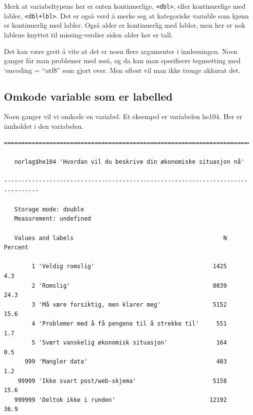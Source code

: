\documentclass[
  letterpaper,
  DIV=11,
  numbers=noendperiod]{scrreprt}
\newenvironment{Shaded}{\begin{snugshade}}{\end{snugshade}}
\newcommand{\FunctionTok}[1]{\textcolor[rgb]{0.28,0.35,0.67}{#1}}
\newcommand{\NormalTok}[1]{\textcolor[rgb]{0.00,0.23,0.31}{#1}}
\newcommand{\SpecialCharTok}[1]{\textcolor[rgb]{0.37,0.37,0.37}{#1}}
\begin{document}
Merk at variabeltypene her er enten kontinuerlige,
\texttt{\textless{}dbl\textgreater{}}, eller kontinuerlige med labler,
\texttt{\textless{}dbl+lbl\textgreater{}}. Det er også verd å merke seg
at kategoriske variable som kjønn er kontinuerlig med labler. Også alder
er kontinuerlig med labler, men her er nok lablene knyttet til
missing-verdier siden alder her er tall.

Det kan være greit å vite at det er noen flere argumenter i
innlesningen. Noen ganger får man problemer med æøå, og da kan man
spesifisere tegnsetting med `encoding = ``utf8'' som gjort over. Men
oftest vil man ikke trenge akkurat det.

\hypertarget{omkode-variable-som-er-labelled}{%
\subsection{Omkode variable som er
labelled}\label{omkode-variable-som-er-labelled}}

Noen ganger vil vi omkode en variabel. Et eksempel er variabelen he104.
Her er innholdet i den variabelen.

\begin{Shaded}
\end{Shaded}

\begin{verbatim}
================================================================================

   norlag$he104 'Hvordan vil du beskrive din økonomiske situasjon nå'

--------------------------------------------------------------------------------

   Storage mode: double
   Measurement: undefined

   Values and labels                                           N Percent
                                                                        
        1 'Veldig romslig'                                  1425     4.3
        2 'Romslig'                                         8039    24.3
        3 'Må være forsiktig, men klarer meg'               5152    15.6
        4 'Problemer med å få pengene til å strekke til'     551     1.7
        5 'Svært vanskelig økonomisk situasjon'              164     0.5
      999 'Mangler data'                                     403     1.2
    99999 'Ikke svart post/web-skjema'                      5158    15.6
   999999 'Deltok ikke i runden'                           12192    36.9
\end{verbatim}
\end{document}
